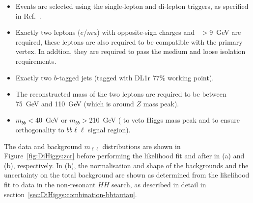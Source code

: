 \begin{itemize}

    \item Events are selected using the single-lepton and di-lepton triggers, 
    as specified in Ref.~\cite{HDBS-2018-33}.
    \item Exactly two leptons ($e$/$mu$) with opposite-sign charges 
    and \pt\ $>$9~GeV are required, these leptons are also required
    to be compatible with the primary vertex. In addtion, they are required
    to pass the medium and loose isolation requirements.
    \item Exactly two $b$-tagged jets (tagged with DL1r 77\% working point).
    \item The reconstructed mass of the two leptons are required to be between 75~GeV
    and 110~GeV (which is around $Z$ mass peak).
    \item $m_{bb}<$40~GeV or $m_{bb}>$210~GeV (
    to veto Higgs mass peak and to ensure orthogonality to $bb\ell\ell$ signal region).

\end{itemize}

The data and background $m_{\ell\ell}$ distributions are shown in Figure~\ref{fig:DiHiggs:zcr}
before performing the likelihood fit and after in (a) and (b), respectively.
In (b), the normalisation and shape of the backgrounds 
and the uncertainty on the total background are shown as determined 
from the likelihood fit to data in the non-resonant $HH$ search, as 
described in detail in section~\ref{sec:DiHiggs:combination-bbtautau}. 

